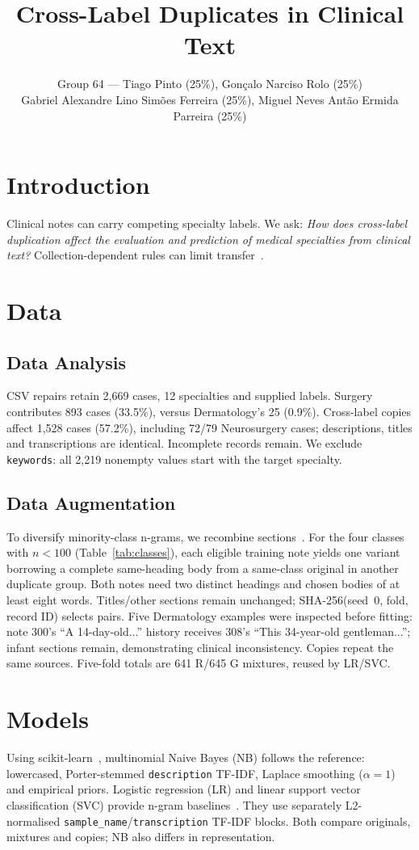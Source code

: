 \documentclass[twocolumn,10pt]{article}
\title{Cross-Label Duplicates in Clinical Text}
\author{\normalsize Group 64 --- Tiago Pinto (25\%), Gonçalo Narciso Rolo (25\%)\\
\normalsize Gabriel Alexandre Lino Simões Ferreira (25\%), Miguel Neves Antão Ermida Parreira (25\%)}
\date{}
\begin{document}
\maketitle

\section{Introduction}
Clinical notes can carry competing specialty labels. We ask:
\emph{How does cross-label duplication affect the evaluation and prediction of
medical specialties from clinical text?} Collection-dependent rules can limit
transfer~\citep{geirhos2020shortcut}.

\section{Data}
\subsection{Data Analysis}
CSV repairs retain 2,669 cases, 12 specialties and supplied labels. Surgery
contributes 893 cases (33.5\%), versus Dermatology's 25 (0.9\%). Cross-label
copies affect 1,528 cases (57.2\%), including 72/79 Neurosurgery cases;
descriptions, titles and transcriptions are identical. Incomplete records remain. We exclude
\texttt{keywords}: all 2,219 nonempty values start with the target specialty.

\subsection{Data Augmentation}
To diversify minority-class n-grams, we recombine sections~\citep{yoon2021ssmix}.
For the four classes with $n<100$ (Table~\ref{tab:classes}), each eligible training
note yields one variant borrowing a complete same-heading body from a same-class
original in another duplicate group. Both notes need two distinct headings and
chosen bodies of at least eight words. Titles/other sections remain unchanged;
SHA-256(seed~0, fold, record ID) selects pairs. Five Dermatology examples were
inspected before fitting: note 300's ``A 14-day-old...'' history receives 308's
``This 34-year-old gentleman...''; infant sections remain, demonstrating clinical
inconsistency. Copies repeat the same sources. Five-fold totals are 641 R/645 G
mixtures, reused by LR/SVC.

\section{Models}
Using scikit-learn~\citep{pedregosa2011scikit}, multinomial Naive Bayes (NB)
follows the reference: lowercased, Porter-stemmed \texttt{description} TF-IDF,
Laplace smoothing ($\alpha=1$) and empirical priors.
Logistic regression (LR) and linear support vector classification (SVC) provide
n-gram baselines~\citep{wang2012baselines}. They use separately L2-normalised
\texttt{sample\_name}/\allowbreak\texttt{transcription} TF-IDF blocks.
Both compare originals, mixtures and copies; NB also differs in representation.
\end{document}
